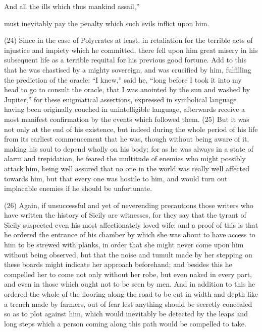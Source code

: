 And all the ills which thus mankind assail,''

must inevitably pay the penalty which such evils inflict upon him.

(24) Since in the case of Polycrates at least, in retaliation for the terrible acts of injustice and
impiety which he committed, there fell upon him great misery in his subsequent life as a terrible
requital for his previous good fortune. Add to this that he was chastised by a mighty sovereign, and
was crucified by him, fulfilling the prediction of the oracle: ``I knew,'' said he, ``long before I took it
into my head to go to consult the oracle, that I was anointed by the sun and washed by Jupiter,'' for
these enigmatical assertions, expressed in symbolical language having been originally couched in
unintelligible language, afterwards receive a most manifest confirmation by the events which
followed them. (25) But it was not only at the end of his existence, but indeed during the whole
period of his life from its earliest commencement that he was, though without being aware of it,
making his soul to depend wholly on his body; for as he was always in a state of alarm and
trepidation, he feared the multitude of enemies who might possibly attack him, being well assured
that no one in the world was really well affected towards him, but that every one was hostile to him,
and would turn out implacable enemies if he should be unfortunate.

(26) Again, if unsuccessful and yet of neverending precautions those writers who have written the
history of Sicily are witnesses, for they say that the tyrant of Sicily suspected even his most
affectionately loved wife; and a proof of this is that he ordered the entrance of his chamber by
which she was about to have access to him to be strewed with planks, in order that she might
never come upon him without being observed, but that the noise and tumult made by her stepping
on these boards might indicate her approach beforehand; and besides this he compelled her to
come not only without her robe, but even naked in every part, and even in those which ought not to
be seen by men. And in addition to this he ordered the whole of the flooring along the road to be cut
in width and depth like a trench made by farmers, out of fear lest anything should be secretly
concealed so as to plot against him, which would inevitably be detected by the leaps and long steps
which a person coming along this path would be compelled to take.

